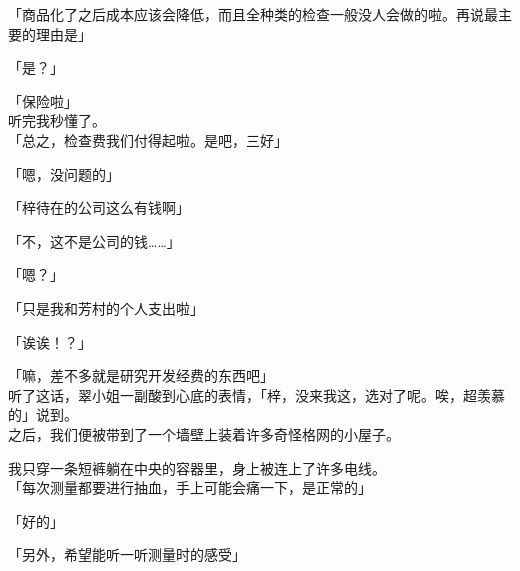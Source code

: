 「商品化了之后成本应该会降低，而且全种类的检查一般没人会做的啦。再说最主要的理由是」

「是？」

「保险啦」\\

听完我秒懂了。\\

「总之，检查费我们付得起啦。是吧，三好」

「嗯，没问题的」

「梓待在的公司这么有钱啊」

「不，这不是公司的钱……」

「嗯？」

「只是我和芳村的个人支出啦」

「诶诶！？」

「嘛，差不多就是研究开发经费的东西吧」\\

听了这话，翠小姐一副酸到心底的表情，「梓，没来我这，选对了呢。唉，超羡慕的」说到。\\

之后，我们便被带到了一个墙壁上装着许多奇怪格网的小屋子。

我只穿一条短裤躺在中央的容器里，身上被连上了许多电线。\\

「每次测量都要进行抽血，手上可能会痛一下，是正常的」

「好的」

「另外，希望能听一听测量时的感受」

